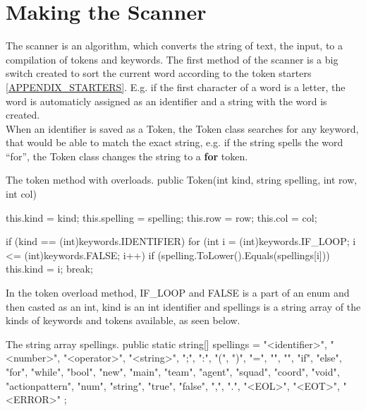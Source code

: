 \section{Making the Scanner}
The scanner is an algorithm, which converts the string of text, the input, to a compilation of tokens and keywords. The first method of the scanner is a big switch created to sort the current word according to the token starters \ref{APPENDIX_STARTERS}. E.g. if the first character of a word is a letter, the word is automaticly assigned as an identifier and a string with the word is created.\\
When an identifier is saved as a Token, the Token class searches for any keyword, that would be able to match the exact string, e.g. if the string spells the word "`for"', the Token class changes the string to a \textbf{for} token.\\

\begin{source}{}{The token method with overloads.}{}
public Token(int kind, string spelling, int row, int col)
        {
            this.kind = kind;
            this.spelling = spelling;
            this.row = row;
            this.col = col;

            if (kind == (int)keywords.IDENTIFIER)
            {
                for (int i = (int)keywords.IF_LOOP; i <= (int)keywords.FALSE; i++)
                {
                    if (spelling.ToLower().Equals(spellings[i]))
                    {
                        this.kind = i;
                        break;
                    }
                }
            }
        }
\end{source}
In the token overload method, IF\_LOOP and FALSE is a part of an enum and then casted as an int, kind is an int identifier and spellings is a string array of the kinds of keywords and tokens available, as seen below.

\begin{source}{}{The string array spellings.}{}
public static string[] spellings = 
        {
            "<identifier>", "<number>", "<operator>", "<string>", ";", ":", "(", ")", "=", "{", "}", 
            "if", "else", "for", "while", "bool", "new", "main", "team", "agent", "squad", "coord", "void", 
            "actionpattern", "num", "string", "true", "false", ",", ".", "<EOL>", "<EOT>", "<ERROR>"                         
        };
\end{source}

